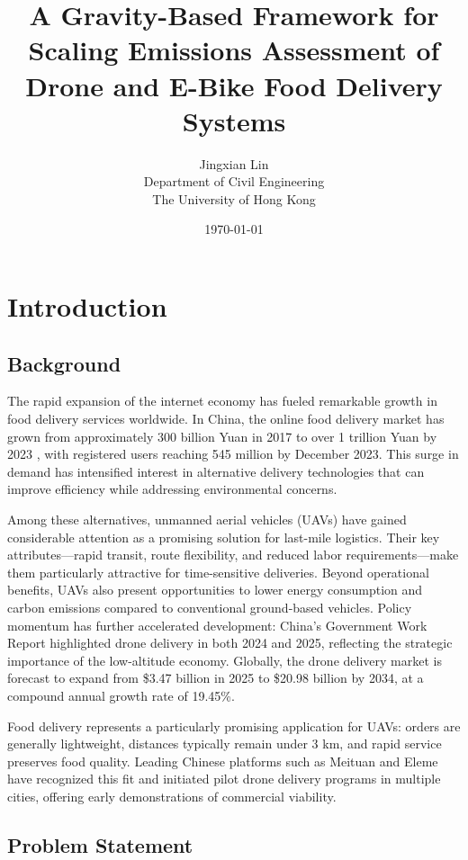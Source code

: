 \documentclass[11pt]{article}
\title{A Gravity-Based Framework for Scaling Emissions Assessment of Drone and E-Bike Food Delivery Systems}
\author{Jingxian Lin\\Department of Civil Engineering\\The University of Hong Kong}
\date{\today}
\begin{document}
\maketitle

\newpage
\tableofcontents
\newpage

\section{Introduction}

\subsection{Background}

The rapid expansion of the internet economy has fueled remarkable growth in food delivery services worldwide. In China, the online food delivery market has grown from approximately 300 billion Yuan in 2017 to over 1 trillion Yuan by 2023 \parencite{statista2024chinafooddelivery}, with registered users reaching 545 million by December 2023. This surge in demand has intensified interest in alternative delivery technologies that can improve efficiency while addressing environmental concerns.

Among these alternatives, unmanned aerial vehicles (UAVs) have gained considerable attention as a promising solution for last-mile logistics. Their key attributes—rapid transit, route flexibility, and reduced labor requirements—make them particularly attractive for time-sensitive deliveries. Beyond operational benefits, UAVs also present opportunities to lower energy consumption and carbon emissions compared to conventional ground-based vehicles. Policy momentum has further accelerated development: China's Government Work Report highlighted drone delivery in both 2024 and 2025, reflecting the strategic importance of the low-altitude economy. Globally, the drone delivery market is forecast to expand from \$3.47 billion in 2025 to \$20.98 billion by 2034, at a compound annual growth rate of 19.45\%.

Food delivery represents a particularly promising application for UAVs: orders are generally lightweight, distances typically remain under 3 km, and rapid service preserves food quality. Leading Chinese platforms such as Meituan and Eleme have recognized this fit and initiated pilot drone delivery programs in multiple cities, offering early demonstrations of commercial viability.

\subsection{Problem Statement}
\end{document}
